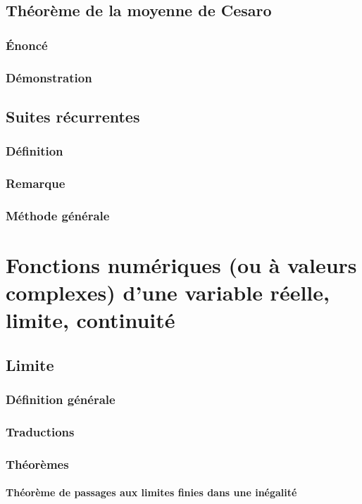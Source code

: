 \documentclass[12pt,a4paper,french]{book}
\begin{document}
	\section{Théorème de la moyenne de Cesaro}
		\subsection{Énoncé}
		\subsection{Démonstration}
	\section{Suites récurrentes}
		\subsection{Définition}
		\subsection{Remarque}
		\subsection{Méthode générale}
		
\chapter{Fonctions numériques (ou à valeurs complexes) d'une variable réelle, limite, continuité}
	\section{Limite}
		\subsection{Définition générale}
		\subsection{Traductions}
		\subsection{Théorèmes}
			\subsubsection{Théorème de passages aux limites finies dans une inégalité}
\end{document}
